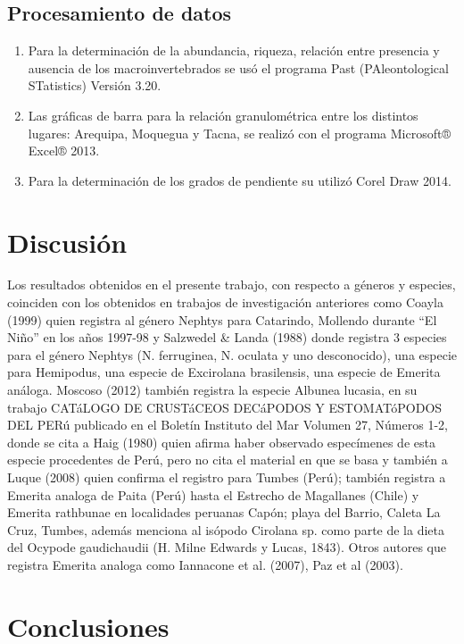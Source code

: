 \documentclass[5p,times,authoryear]{elsarticle}
\begin{document}
\subsection{Procesamiento de datos}
\begin{enumerate}
\item Para la determinaci\'on de la abundancia, riqueza, relaci\'on entre presencia y ausencia de los macroinvertebrados se us\'o el programa Past (PAleontological STatistics) Versi\'on 3.20.
\item Las gr\'aficas de barra para la relaci\'on granulom\'etrica entre los distintos lugares: Arequipa, Moquegua y Tacna, se realiz\'o con el programa Microsoft® Excel® 2013.
\item Para la determinaci\'on de los grados de pendiente su utiliz\'o Corel Draw 2014.
\end{enumerate}

\section{Discusi\'on}

Los resultados obtenidos en el presente trabajo, con respecto a g\'eneros y especies, coinciden con los obtenidos en trabajos de investigaci\'on anteriores como Coayla (1999) quien registra al g\'enero Nephtys para Catarindo, Mollendo durante “El Niño” en los años 1997-98 y Salzwedel \& Landa (1988) donde registra 3 especies para el g\'enero Nephtys (N. ferruginea, N. oculata y uno desconocido), una especie para Hemipodus, una especie de Excirolana brasilensis, una especie de Emerita an\'aloga.
Moscoso (2012) tambi\'en registra la especie Albunea lucasia, en su trabajo CAT\'aLOGO DE CRUST\'aCEOS DEC\'aPODOS Y ESTOMAT\'oPODOS DEL PER\'u publicado en el Bolet\'in Instituto del Mar Volumen 27, N\'umeros 1-2, donde se cita a Haig (1980) quien afirma haber observado espec\'imenes de esta especie procedentes de Per\'u, pero no cita el material en que se basa y tambi\'en a Luque (2008) quien confirma el registro para Tumbes (Per\'u); tambi\'en registra a Emerita analoga de Paita (Per\'u) hasta el Estrecho de Magallanes (Chile) y Emerita rathbunae en localidades peruanas Cap\'on; playa del Barrio, Caleta La Cruz, Tumbes, adem\'as menciona al is\'opodo Cirolana sp. como parte de la dieta del Ocypode gaudichaudii (H. Milne Edwards y Lucas, 1843). Otros autores que registra Emerita analoga como Iannacone et al. (2007), Paz et al (2003).

\section{Conclusiones}
\end{document}
